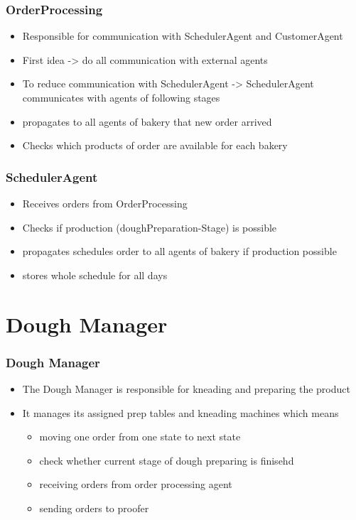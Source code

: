 \documentclass[11pt]{beamer}
\begin{document}
\begin{frame}
\frametitle{OrderProcessing}
\begin{itemize}
	\item Responsible for communication with SchedulerAgent and CustomerAgent
	\item First idea -> do all communication with external agents
	\item To reduce communication with SchedulerAgent -> SchedulerAgent communicates with agents of following stages
	\item propagates to all agents of bakery that new order arrived
	\item Checks which products of order are available for each bakery
\end{itemize}
\end{frame}

\begin{frame}
\frametitle{SchedulerAgent}
\begin{itemize}
	\item Receives orders from OrderProcessing
	\item Checks if production (doughPreparation-Stage) is possible
	\item propagates schedules order to all agents of bakery if production possible
	\item stores whole schedule for all days
\end{itemize}
\end{frame}

    \section{Dough Manager}
\begin{frame}
\frametitle{Dough Manager}
\begin{itemize}
	\item The Dough Manager is responsible for kneading and preparing the product
	\item It manages its assigned prep tables and kneading machines which means
	\begin{itemize}
		\item moving one order from one state to next state
		\item check whether current stage of dough preparing is finisehd
		\item receiving orders from order processing agent
		\item sending orders to proofer
	\end{itemize}
\end{itemize}
\end{frame}
\end{document}
